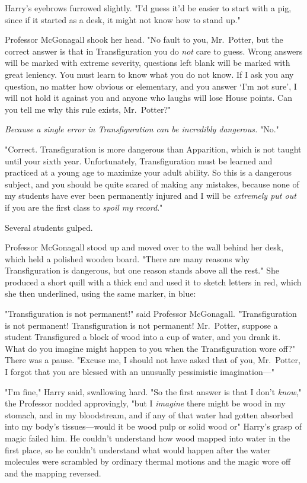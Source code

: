 Harry's eyebrows furrowed slightly. "I'd guess it'd be easier to start with a
pig, since if it started as a desk, it might not know how to stand up."

Professor McGonagall shook her head. "No fault to you, Mr.~Potter, but the
correct answer is that in Transfiguration you do \emph{not} care to guess.
Wrong answers will be marked with extreme severity, questions left blank will
be marked with great leniency. You must learn to know what you do not know. If
I ask you any question, no matter how obvious or elementary, and you answer
`I'm not sure', I will not hold it against you and anyone who laughs will lose
House points. Can you tell me why this rule exists, Mr.~Potter?"

\emph{Because a single error in Transfiguration can be incredibly dangerous.}
"No."

"Correct. Transfiguration is more dangerous than Apparition, which is not
taught until your sixth year. Unfortunately, Transfiguration must be learned
and practiced at a young age to maximize your adult ability. So this is a
dangerous subject, and you should be quite scared of making any mistakes,
because none of my students have ever been permanently injured and I will be
\emph{extremely put out} if you are the first class to \emph{spoil my record}."

Several students gulped.

Professor McGonagall stood up and moved over to the wall behind her desk, which
held a polished wooden board. "There are many reasons why Transfiguration is
dangerous, but one reason stands above all the rest." She produced a short
quill with a thick end and used it to sketch letters in red, which she then
underlined, using the same marker, in blue:


"Transfiguration is not permanent!" said Professor McGonagall. "Transfiguration
is not permanent! Transfiguration is not permanent! Mr.~Potter, suppose a
student Transfigured a block of wood into a cup of water, and you drank it.
What do you imagine might happen to you when the Transfiguration wore off?"
There was a pause. "Excuse me, I should not have asked that of you, Mr.~Potter,
I forgot that you are blessed with an unusually pessimistic imagination---"

"I'm fine," Harry said, swallowing hard. "So the first answer is that I don't
\emph{know}," the Professor nodded approvingly, "but I \emph{imagine} there
might be{\el} wood in my stomach, and in my bloodstream, and if any of that
water had gotten absorbed into my body's tissues---would it be wood pulp or
solid wood or{\el}" Harry's grasp of magic failed him. He couldn't
understand how wood mapped into water in the first place, so he couldn't
understand what would happen after the water molecules were scrambled by
ordinary thermal motions and the magic wore off and the mapping reversed.

